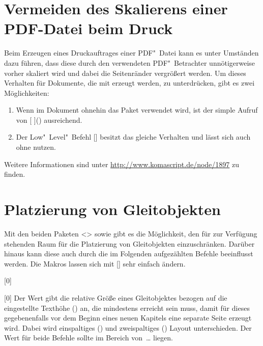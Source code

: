 \section{Vermeiden des Skalierens einer PDF-Datei beim Druck}
%
Beim Erzeugen eines Druckauftrages einer PDF"~Datei kann es unter Umständen 
dazu führen, dass diese durch den verwendeten PDF"~Betrachter unnötigerweise 
vorher skaliert wird und dabei die Seitenränder vergrößert werden. Um dieses 
Verhalten für Dokumente, die mit  erzeugt werden, zu 
unterdrücken, gibt es zwei Möglichkeiten:
%
\begin{enumerate}
\item Wenn im Dokument ohnehin das Paket  verwendet wird, 
  ist der simple Aufruf von
  [%
  ]()
  ausreichend.
\item Der Low"~Level"~Befehl
  []
  besitzt das gleiche Verhalten und lässt sich auch ohne  
  nutzen.
\end{enumerate}
%
Weitere Informationen sind unter \url{http://www.komascript.de/node/1897} 
zu finden.



\section{Platzierung von Gleitobjekten}
%
%
%
Mit den beiden Paketen <> sowie  gibt es die 
Möglichkeit, den für  zur Verfügung stehenden Raum für die 
Platzierung von Gleitobjekten einzuschränken. Darüber hinaus kann diese auch 
durch die im Folgenden aufgezählten Befehle beeinflusst werden. Die Makros 
lassen sich mit [] 
sehr einfach ändern.

\begin{Declaration}{}[0\floatpagefraction]
\begin{Declaration}{}[0\dblfloatpagefraction]
\printdeclarationlist%
%
Der Wert gibt die relative Größe eines Gleitobjektes bezogen auf die 
eingestellte Texthöhe () an, die mindestens erreicht sein 
muss, damit für dieses gegebenenfalls vor dem Beginn eines neuen Kapitels eine 
separate Seite erzeugt wird. Dabei wird einspaltiges 
() und zweispaltiges () 
Layout unterschieden. Der Wert für beide Befehle sollte im Bereich 
von~\dots{} liegen.
\end{Declaration}
\end{Declaration}

